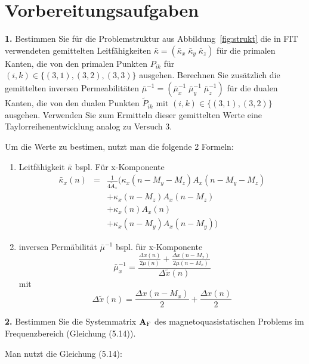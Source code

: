 \documentclass[Protokollheft.tex]{subfiles}
\begin{document}
\section{Vorbereitungsaufgaben}

\begin{framed}
	\noindent \textbf{1.} Bestimmen Sie für die Problemstruktur aus Abbildung~\ref{fig:strukt} die in FIT verwendeten
    gemittelten Leitfähigkeiten $\bar{\kappa}=(\bar{\kappa}_x\;\bar{\kappa}_y\;\bar{\kappa}_z)$ für die primalen Kanten, die von den primalen Punkten $P_{ik}$ für $(i,k)\in\{(3,1),(3,2),(3,3)\}$ ausgehen. Berechnen Sie zusätzlich die gemittelten inversen Permeabilitäten $\bar{\mu}^{-1}=(\bar{\mu}_x^{-1}\;\bar{\mu}_y^{-1}\;\bar{\mu}_z^{-1})$ für die dualen Kanten, die von den dualen Punkten $\widetilde{P}_{ik}$ mit $(i,k)\in\{(3,1),(3,2)\}$ ausgehen. Verwenden Sie zum Ermitteln dieser gemittelten Werte eine Taylorreihenentwicklung analog zu Versuch 3.\label{exer:averagedMaterials}
\end{framed}

Um die Werte zu bestimen, nutzt man die folgende 2 Formeln:
\begin{enumerate}
	\item Leitfähigkeit $\bar{\kappa}$
     bspl. Für x-Komponente
     \begin{eqnarray*} \bar{\kappa}_x(n)& = &\frac{1}{4\tilde{A}_x}(\kappa_x(n-M_y-M_z)A_x(n-M_y-M_z)\\
     &  &+\kappa_x(n-M_z)A_x(n-M_z)\\
     &    &+\kappa_x(n)A_x(n)\\
     &   &+\kappa_x(n-M_y)A_x(n-M_y))
    \end{eqnarray*}

 \item inversen Permäbilität $\bar{\mu}^{-1}$ bspl. für x-Komponente
$$\bar{\mu}_x^{-1}=\frac{\frac{\Delta x(n)}{2\mu(n)}+\frac{\Delta x(n-M_x)}{2\mu(n-M_x)}}{\Delta\tilde{x}(n)}$$ mit $$ \Delta\tilde{x}(n)=\frac{\Delta x(n-M_x)}{2}+\frac{\Delta x(n)}{2}$$
\end{enumerate}
\begin{framed}
	\noindent \textbf{2.} Bestimmen Sie die Systemmatrix $ \mathbf{A} _\text{F}$ des magnetoquasistatischen Problems im Frequenzbereich (Gleichung (5.14)).\label{exer:systemMatMQSF}
\end{framed}

Man nutzt die Gleichung (5.14):
\end{document}
